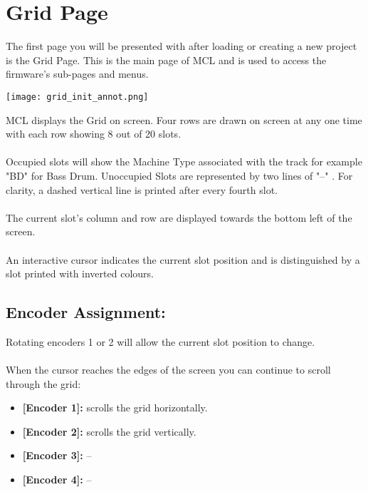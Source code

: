 
\chapter{Grid Page}
The first page you will be presented with after loading or creating a new project is the Grid Page. This is the main page of MCL and is used to access the firmware's sub-pages and menus.

\begin{center}
	\texttt{[image: grid\_init\_annot.png]}
\end{center}
MCL displays the Grid on screen. Four rows are drawn on screen at any one time with each row showing 8 out of 20 slots.\\
\\
Occupied slots will show the Machine Type associated with the track for example "BD" for Bass Drum. Unoccupied Slots are represented by two lines of "--" . For clarity, a dashed vertical line is printed after every fourth slot. \\
\\
The current slot's column and row are displayed towards the bottom left of the screen.\\
\\
An interactive cursor indicates the current slot position and is distinguished by a slot printed with inverted colours.
\section{Encoder Assignment:}
Rotating encoders 1 or 2 will allow the current slot position to change.\\
\\
When the cursor reaches the edges of the screen you can continue to scroll through the grid:
\begin{itemize}
	\item \textbf{[Encoder 1]:} scrolls the grid horizontally.
	\item \textbf{[Encoder 2]:} scrolls the grid vertically.
	\item \textbf{[Encoder 3]:} --
	\item \textbf{[Encoder 4]:} --
\end{itemize}


